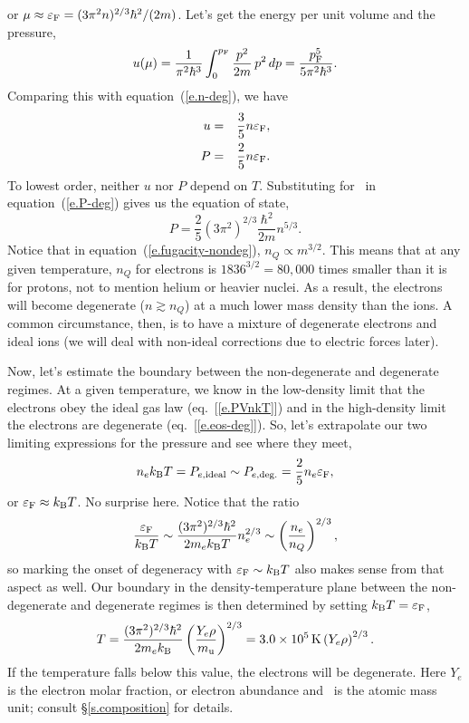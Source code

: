 or $\mu \approx \varepsilon_{\mathrm{F}} = (3\pi^{2}n)^{2/3} \hbar^{2}/(2m)$.  Let's get the energy per unit volume and the pressure,
\begin{equation}
u(\mu) = \frac{1}{\pi^{2}\hbar^{3}}\int_{0}^{p_{\mathrm{F}}} \frac{p^{2}}{2m}\,p^{2}\,dp = \frac{p_{\mathrm{F}}^{5}}{5\pi^{2}\hbar^{3}}.
\end{equation}
Comparing this with equation~(\ref{e.n-deg}), we have
\begin{eqnarray}
u &=& \frac{3}{5}n\varepsilon_{\mathrm{F}},\label{e.u-deg}\\
P &=& \frac{2}{5}n\varepsilon_{\mathrm{F}}\label{e.P-deg}.
\end{eqnarray}
To lowest order, neither $u$ nor $P$ depend on $T$.  Substituting for \eF\ in equation~(\ref{e.P-deg}) gives us the equation of state,
\begin{equation}\label{e.eos-deg}
P = \frac{2}{5}\left(3\pi^{2}\right)^{2/3}\frac{\hbar^{2}}{2m}n^{5/3}.
\end{equation}
Notice that in equation~(\ref{e.fugacity-nondeg}), $n_{Q}\propto m^{3/2}$.  This means that at any given temperature, $n_{Q}$ for electrons is $1836^{3/2} = 80,000$ times smaller than it is for protons, not to mention helium or heavier nuclei. As a result, the electrons will become degenerate ($n\gtrsim n_{Q}$) at a much lower mass density than the ions.    A common circumstance, then, is to have a mixture of degenerate electrons and ideal ions (we will deal with non-ideal corrections due to electric forces later).  

Now, let's estimate the boundary between the non-degenerate and degenerate regimes. At a given temperature, we know in the low-density limit that the electrons obey the ideal gas law (eq.~[\ref{e.PVnkT}]) and in the high-density limit the electrons are degenerate (eq.~[\ref{e.eos-deg}]). So, let's extrapolate our two limiting expressions for the pressure and see where they meet,
\begin{equation}
n_{e}k_\mathrm{B} T = P_{e,\mathrm{ideal}} \sim P_{e,\mathrm{deg.}} 
  = \frac{2}{5}n_{e}\varepsilon_{\mathrm{F}},
\end{equation}
or $\varepsilon_{\mathrm{F}} \approx k_\mathrm{B} T$.  No surprise here.  Notice that the ratio
\begin{equation}
\frac{\varepsilon_{\mathrm{F}}}{k_\mathrm{B} T} \sim \frac{(3\pi^{2})^{2/3}\hbar^{2}}{2m_{e}k_\mathrm{B} T}n_{e}^{2/3} \sim \left(\frac{n_{e}}{n_{Q}}\right)^{2/3},
\end{equation}
so marking the onset of degeneracy with $\varepsilon_{\mathrm{F}}\sim k_\mathrm{B} T$ also makes sense from that aspect as well. Our boundary in the density-temperature plane between the non-degenerate and degenerate regimes is then determined by setting $k_\mathrm{B} T = \varepsilon_{\mathrm{F}}$,
\begin{equation}\label{e.TF}
T = \frac{(3\pi^{2})^{2/3}\hbar^{2}}{2m_{e}k_\mathrm{B} }\left(\frac{Y_{e}\rho}{m_\mathrm{u}}\right)^{2/3} = 3.0\times 10^{5}\,\mathrm{K} \left(Y_{e}\rho\right)^{2/3}.
\end{equation}
If the temperature falls below this value, the electrons will be degenerate. Here $Y_{e}$ is the electron molar fraction, or electron abundance and \mb\ is the atomic mass unit; consult \S\ref{s.composition} for details.

